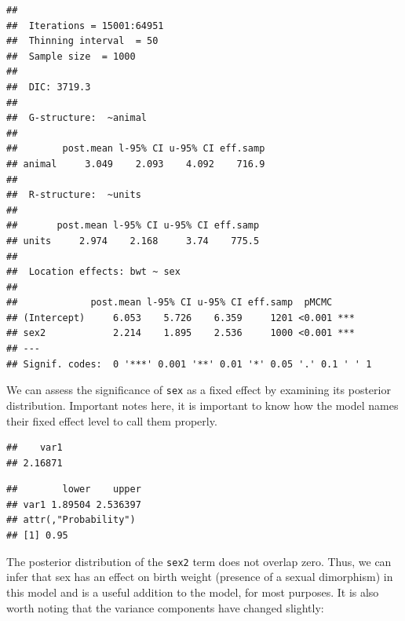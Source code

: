 \documentclass[
  12pt,
]{book}
\newenvironment{Shaded}{\begin{snugshade}}{\end{snugshade}}
\newcommand{\FloatTok}[1]{\textcolor[rgb]{0.00,0.00,0.81}{#1}}
\newcommand{\KeywordTok}[1]{\textcolor[rgb]{0.13,0.29,0.53}{\textbf{#1}}}
\newcommand{\NormalTok}[1]{#1}
\newcommand{\OperatorTok}[1]{\textcolor[rgb]{0.81,0.36,0.00}{\textbf{#1}}}
\newcommand{\StringTok}[1]{\textcolor[rgb]{0.31,0.60,0.02}{#1}}
\begin{document}
\begin{verbatim}
## 
##  Iterations = 15001:64951
##  Thinning interval  = 50
##  Sample size  = 1000 
## 
##  DIC: 3719.3 
## 
##  G-structure:  ~animal
## 
##        post.mean l-95% CI u-95% CI eff.samp
## animal     3.049    2.093    4.092    716.9
## 
##  R-structure:  ~units
## 
##       post.mean l-95% CI u-95% CI eff.samp
## units     2.974    2.168     3.74    775.5
## 
##  Location effects: bwt ~ sex 
## 
##             post.mean l-95% CI u-95% CI eff.samp  pMCMC    
## (Intercept)     6.053    5.726    6.359     1201 <0.001 ***
## sex2            2.214    1.895    2.536     1000 <0.001 ***
## ---
## Signif. codes:  0 '***' 0.001 '**' 0.01 '*' 0.05 '.' 0.1 ' ' 1
\end{verbatim}

We can assess the significance of \texttt{sex} as a fixed effect by examining its posterior distribution. Important notes here, it is important to know how the model names their fixed effect level to call them properly.

\begin{Shaded}
\end{Shaded}

\begin{verbatim}
##    var1 
## 2.16871
\end{verbatim}

\begin{Shaded}
\end{Shaded}

\begin{verbatim}
##        lower    upper
## var1 1.89504 2.536397
## attr(,"Probability")
## [1] 0.95
\end{verbatim}

The posterior distribution of the \texttt{sex2} term does not overlap zero. Thus, we can infer that sex has an effect on birth weight (presence of a sexual dimorphism) in this model and is a useful addition to the model, for most purposes. It is also worth noting that the variance components have changed slightly:
\end{document}
